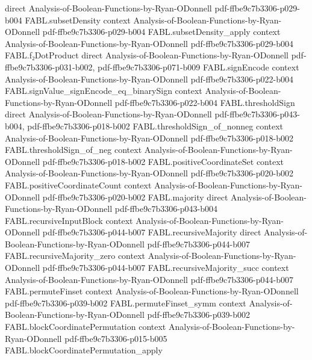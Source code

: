 \begin{theorem}
  {direct}
  {Analysis-of-Boolean-Functions-by-Ryan-ODonnell}
  {pdf-ffbe9c7b3306-p029-b004}
\proofstep
  {FABL.subsetDensity}
  {context}
  {Analysis-of-Boolean-Functions-by-Ryan-ODonnell}
  {pdf-ffbe9c7b3306-p029-b004}
\proofstep
  {FABL.subsetDensity_apply}
  {context}
  {Analysis-of-Boolean-Functions-by-Ryan-ODonnell}
  {pdf-ffbe9c7b3306-p029-b004}
\proofstep
  {FABL.f₂DotProduct}
  {direct}
  {Analysis-of-Boolean-Functions-by-Ryan-ODonnell}
  {pdf-ffbe9c7b3306-p031-b002,
    pdf-ffbe9c7b3306-p071-b009}
\proofstep
  {FABL.signEncode}
  {context}
  {Analysis-of-Boolean-Functions-by-Ryan-ODonnell}
  {pdf-ffbe9c7b3306-p022-b004}
\proofstep
  {FABL.signValue_signEncode_eq_binarySign}
  {context}
  {Analysis-of-Boolean-Functions-by-Ryan-ODonnell}
  {pdf-ffbe9c7b3306-p022-b004}
\proofstep
  {FABL.thresholdSign}
  {direct}
  {Analysis-of-Boolean-Functions-by-Ryan-ODonnell}
  {pdf-ffbe9c7b3306-p043-b004,
    pdf-ffbe9c7b3306-p018-b002}
\proofstep
  {FABL.thresholdSign_of_nonneg}
  {context}
  {Analysis-of-Boolean-Functions-by-Ryan-ODonnell}
  {pdf-ffbe9c7b3306-p018-b002}
\proofstep
  {FABL.thresholdSign_of_neg}
  {context}
  {Analysis-of-Boolean-Functions-by-Ryan-ODonnell}
  {pdf-ffbe9c7b3306-p018-b002}
\proofstep
  {FABL.positiveCoordinateSet}
  {context}
  {Analysis-of-Boolean-Functions-by-Ryan-ODonnell}
  {pdf-ffbe9c7b3306-p020-b002}
\proofstep
  {FABL.positiveCoordinateCount}
  {context}
  {Analysis-of-Boolean-Functions-by-Ryan-ODonnell}
  {pdf-ffbe9c7b3306-p020-b002}
\proofstep
  {FABL.majority}
  {direct}
  {Analysis-of-Boolean-Functions-by-Ryan-ODonnell}
  {pdf-ffbe9c7b3306-p043-b004}
\proofstep
  {FABL.recursiveInputBlock}
  {context}
  {Analysis-of-Boolean-Functions-by-Ryan-ODonnell}
  {pdf-ffbe9c7b3306-p044-b007}
\proofstep
  {FABL.recursiveMajority}
  {direct}
  {Analysis-of-Boolean-Functions-by-Ryan-ODonnell}
  {pdf-ffbe9c7b3306-p044-b007}
\proofstep
  {FABL.recursiveMajority_zero}
  {context}
  {Analysis-of-Boolean-Functions-by-Ryan-ODonnell}
  {pdf-ffbe9c7b3306-p044-b007}
\proofstep
  {FABL.recursiveMajority_succ}
  {context}
  {Analysis-of-Boolean-Functions-by-Ryan-ODonnell}
  {pdf-ffbe9c7b3306-p044-b007}
\proofstep
  {FABL.permuteFinset}
  {context}
  {Analysis-of-Boolean-Functions-by-Ryan-ODonnell}
  {pdf-ffbe9c7b3306-p039-b002}
\proofstep
  {FABL.permuteFinset_symm}
  {context}
  {Analysis-of-Boolean-Functions-by-Ryan-ODonnell}
  {pdf-ffbe9c7b3306-p039-b002}
\proofstep
  {FABL.blockCoordinatePermutation}
  {context}
  {Analysis-of-Boolean-Functions-by-Ryan-ODonnell}
  {pdf-ffbe9c7b3306-p015-b005}
\proofstep
  {FABL.blockCoordinatePermutation_apply}

\end{theorem}
